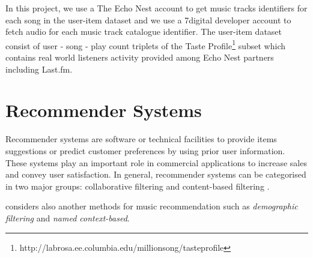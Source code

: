 In this project, we use a The Echo Nest account to get music tracks identifiers for each song in the user-item dataset and we use a 7digital developer account to fetch audio for each music track catalogue identifier. The user-item dataset consist of user - song - play count triplets of the Taste Profile\footnote{http://labrosa.ee.columbia.edu/millionsong/tasteprofile} subset which contains real world listeners activity provided among Echo Nest partners including Last.fm.

\section{Recommender Systems}
Recommender systems are software or technical facilities to provide items suggestions or predict customer preferences by using prior user information. These systems play an important role in commercial applications to increase sales and convey user satisfaction. In general, recommender systems can be categorised in two major groups: collaborative filtering and content-based filtering \parencite{melville2010recommender}.

\textcite{1242} considers also another methods for music recommendation such as \textit{demographic filtering} and \textit{named context-based}.

